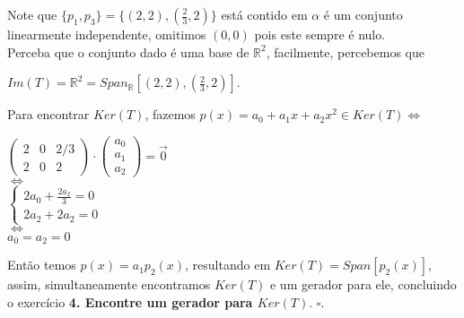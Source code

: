 \documentclass[12pt]{article}
\begin{document}
	Note que $\lbrace p_1, p_3 \rbrace = \lbrace (2,2), (\frac{2}{3}, 2) \rbrace$ está contido em $\alpha$ é um conjunto linearmente independente, omitimos $(0,0)$ pois este sempre é nulo.\\
	Perceba que o conjunto dado é uma base de $\mathbb{R}^2$, facilmente, percebemos que 
	\begin{center} $Im(T) = \mathbb{R}^2 = Span_{\mathbb{R}}[(2,2), (\frac{2}{3}, 2)]$.\end{center}
	Para encontrar $Ker(T)$, fazemos $p(x) = a_0 + a_1 x + a_2 x^2 \in Ker(T) \Leftrightarrow$\\
	\begin{center}
	$\begin{pmatrix} 2 & 0 & 2/3 \\ 2 & 0 & 2 \end{pmatrix} \cdot \begin{pmatrix} a_0 \\ a_1 \\ a_2	 \end{pmatrix} = \overrightarrow{0}$ \\[5pt]
	$\Leftrightarrow$ \\[5pt]
	$\begin{cases} 2a_0 + \frac{2a_2}{3} = 0 \\ 2a_2 + 2a_2 = 0 \end{cases}$\\[5pt]
	$\Leftrightarrow$\\[5pt]
	$a_0 = a_2 = 0$
	\end{center}
	Então temos $p(x) = a_1 p_2(x)$, resultando em $Ker(T) = Span[p_2(x)]$, assim, simultaneamente encontramos $Ker(T)$ e um gerador para ele, concluindo o exercício \textbf{4. Encontre um gerador para $Ker(T)$}. $\square$.
\end{document}
